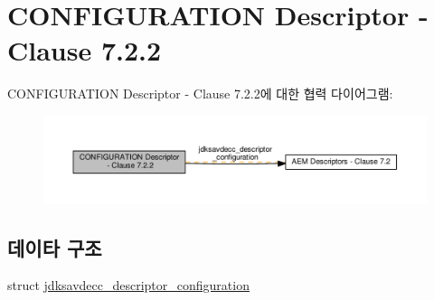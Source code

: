 \hypertarget{group__descriptor__configuration}{}\section{C\+O\+N\+F\+I\+G\+U\+R\+A\+T\+I\+ON Descriptor -\/ Clause 7.2.2}
\label{group__descriptor__configuration}
C\+O\+N\+F\+I\+G\+U\+R\+A\+T\+I\+ON Descriptor -\/ Clause 7.2.2에 대한 협력 다이어그램\+:
\nopagebreak
\begin{figure}[H]
\begin{center}
\leavevmode
\includegraphics[width=350pt]{group__descriptor__configuration}
\end{center}
\end{figure}
\subsection*{데이타 구조}
\begin{DoxyCompactItemize}
\item 
struct \hyperlink{structjdksavdecc__descriptor__configuration}{jdksavdecc\+\_\+descriptor\+\_\+configuration}
\end{DoxyCompactItemize}

